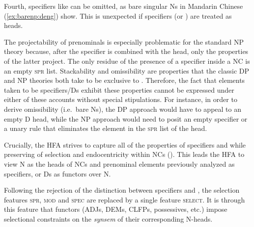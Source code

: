 \documentclass[output=paper,colorlinks,citecolor=brown]{langscibook}
\begin{document}
Fourth, specifiers like  can be omitted, as bare singular Ns in Mandarin Chinese (\ref{ex:barenp:deng}) show. This is unexpected if specifiers (or )  are treated as heads.


The projectability of prenominals is especially problematic for the standard NP theory because, after the specifier is combined with the head, only the properties of the latter project. The only residue of the presence of a specifier inside a NC is an empty \textsc{spr} list. Stackability and omissibility are  properties that the classic DP and NP theories both take to be exclusive to . Therefore, the fact that elements taken to be specifiers/Ds exhibit these properties cannot be  expressed under either of these accounts without special stipulations. For instance, in order to derive omissibility (i.e.\ bare Ns), the DP approach would have to appeal to an empty D head, while the NP approach would need to posit an empty specifier or a unary rule that eliminates the element in the \textsc{spr} list of the head.%

Crucially, the HFA strives to capture all of the properties of specifiers and  while preserving  of selection and endocentricity within NCs (\citealt{Chomsky07a,Chomsky&Co19b,Bruening09a,Bruening20a,MyP&Mueller21a}). This leads the HFA to view N as the heads of NCs and prenominal elements previously analyzed as specifiers,  or Ds as functors over N. %


Following  the rejection of the distinction between specifiers and , the selection features \textsc{spr}, \textsc{mod} and \textsc{spec} are replaced by a single feature \textsc{select}. It is through this feature that functors (ADJs, DEMs, CLFPs, possessives, etc.) impose selectional constraints on the \textit{synsem} of their corresponding N-heads. %
\end{document}
